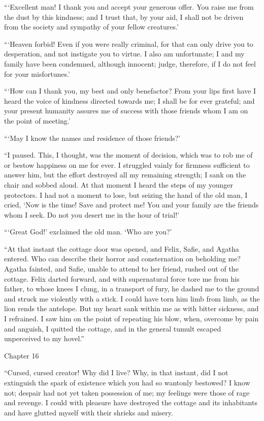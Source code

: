 \documentclass[12pt,openright]{book}
\begin{document}
“‘Excellent man! I thank you and accept your generous offer. You raise me from the dust by this kindness; and I trust that, by your aid, I shall not be driven from the society and sympathy of your fellow creatures.’

“‘Heaven forbid! Even if you were really criminal, for that can only drive you to desperation, and not instigate you to virtue. I also am unfortunate; I and my family have been condemned, although innocent; judge, therefore, if I do not feel for your misfortunes.’

“‘How can I thank you, my best and only benefactor? From your lips first have I heard the voice of kindness directed towards me; I shall be for ever grateful; and your present humanity assures me of success with those friends whom I am on the point of meeting.’

“‘May I know the names and residence of those friends?’

“I paused. This, I thought, was the moment of decision, which was to rob me of or bestow happiness on me for ever. I struggled vainly for firmness sufficient to answer him, but the effort destroyed all my remaining strength; I sank on the chair and sobbed aloud. At that moment I heard the steps of my younger protectors. I had not a moment to lose, but seizing the hand of the old man, I cried, ‘Now is the time! Save and protect me! You and your family are the friends whom I seek. Do not you desert me in the hour of trial!’

“‘Great God!’ exclaimed the old man. ‘Who are you?’

“At that instant the cottage door was opened, and Felix, Safie, and Agatha entered. Who can describe their horror and consternation on beholding me? Agatha fainted, and Safie, unable to attend to her friend, rushed out of the cottage. Felix darted forward, and with supernatural force tore me from his father, to whose knees I clung, in a transport of fury, he dashed me to the ground and struck me violently with a stick. I could have torn him limb from limb, as the lion rends the antelope. But my heart sank within me as with bitter sickness, and I refrained. I saw him on the point of repeating his blow, when, overcome by pain and anguish, I quitted the cottage, and in the general tumult escaped unperceived to my hovel.”

Chapter 16

“Cursed, cursed creator! Why did I live? Why, in that instant, did I not extinguish the spark of existence which you had so wantonly bestowed? I know not; despair had not yet taken possession of me; my feelings were those of rage and revenge. I could with pleasure have destroyed the cottage and its inhabitants and have glutted myself with their shrieks and misery.
\end{document}
